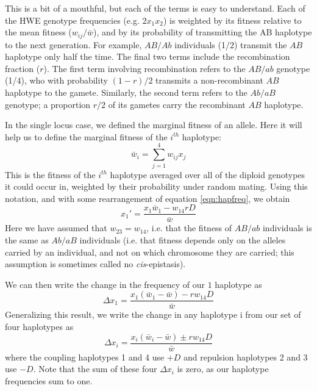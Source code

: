 This is a bit of a mouthful, but each of the terms is easy to understand. Each of the HWE genotype frequencies (e.g. $2x_1x_2$) is weighted by its fitness relative to the mean fitness ($w_{ij}/\bar{w}$), and by its probability of transmitting the AB haplotype to the next generation. For example, $AB/Ab$ individuals (1/2) transmit the $AB$ haplotype only half the time. The final two terms include the recombination fraction ($r$). The first term involving recombination refers to the $AB/ab$ genotype (1/4), who with probability $(1-r)/2$ transmits a non-recombinant $AB$ haplotype to the gamete. Similarly, the second term refers to the  $Ab/aB$ genotype; a proportion $r/2$ of its gametes carry the recombinant $AB$ haplotype. 

In the single locus case, we defined the marginal fitness of an allele. Here it will help us to define the marginal fitness of the $i^{th}$ haplotype:
\begin{equation}
\bar{w}_i = \sum_{j=1}^4 w_{ij} x_j
\end{equation}
This is the fitness of the $i^{th}$ haplotype averaged over all of the diploid genotypes it could occur in, weighted by their probability under random mating. Using this notation, and with some rearrangement of equation \eqref{eqn:hapfreq}, we obtain
\begin{equation}
x_1' = \frac{x_1\bar{w}_1 - w_{14} r D}{\bar{w}}
\end{equation}
Here we have assumed that $w_{23}=w_{14}$, i.e. that the fitness of $AB/ab$ individuals is the same as $Ab/aB$ individuals (i.e. that fitness depends only on the alleles carried by an individual, and not on which chromosome they are carried; this assumption is sometimes called no {\it cis}-epistasis). 

We can then write the change in the frequency of our $1$ haplotype as 
\begin{equation}
\Delta x_1= \frac{x_1(\bar{w}_1-\bar{w}) -r w_{14} D}{\bar{w}}
\end{equation}
Generalizing this result, we write the change in any haplotype i from our set of four haplotypes as
\begin{equation}
\Delta x_i= \frac{x_i(\bar{w}_i-\bar{w}) \pm r w_{14} D}{\bar{w}}  \label{eqn:two_loc_sel}
\end{equation}
where the coupling haplotypes 1 and 4 use $+D$ and repulsion haplotypes 2 and 3 use $-D$.  Note that the sum of these four $\Delta x_i$ is zero, as our haplotype frequencies sum to one.

